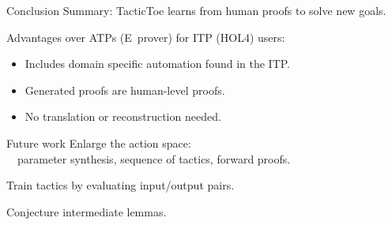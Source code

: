 \documentclass{beamer}
\def\holfour{\textsf{HOL4}\xspace}
\def\eprover{\textsf{E~prover}\xspace}
\begin{document}
\begin{frame}{Conclusion}
Summary: TacticToe learns from human proofs to solve new goals.

\vspace{5mm}

Advantages over ATPs (\eprover) for ITP (\holfour) users:
\begin{itemize}
\item Includes domain specific automation found in the ITP.
\item Generated proofs are human-level proofs.\\
\item No translation or reconstruction needed.\\
\end{itemize}


\end{frame}

\begin{frame}{Future work}
Enlarge the action space:\\ \ \
  parameter synthesis, sequence of tactics, forward proofs.

\vspace{5mm}

Train tactics by evaluating input/output pairs.

\vspace{5mm}

Conjecture intermediate lemmas.
\vspace{5mm}
\end{frame}
 
\end{document}
